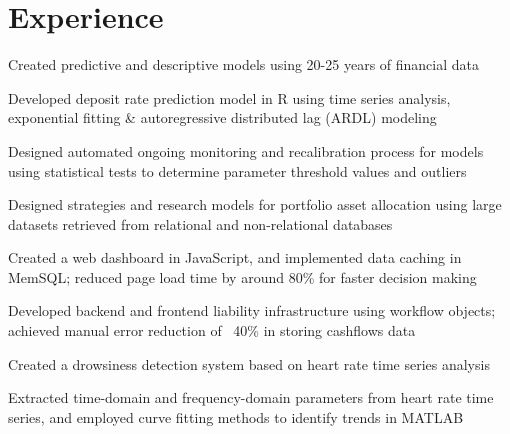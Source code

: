 \documentclass[]{deedy-resume-openfont}
\begin{document}
\begin{minipage}[t]{0.66\textwidth} 


\section{Experience}

\vspace{\topsep} %
\begin{tightemize}
\item Created predictive and descriptive models using 20-25 years of financial data
\item Developed deposit rate prediction model in R using time series analysis, exponential fitting \& autoregressive distributed lag (ARDL) modeling
\item Designed automated ongoing monitoring and recalibration process for models using statistical tests to determine parameter threshold values and outliers
\end{tightemize}
\sectionsep

\begin{tightemize}
\item Designed strategies and research models for portfolio asset allocation using large datasets retrieved from relational and non-relational databases 
\item Created a web dashboard in JavaScript, and implemented data caching in MemSQL; reduced page load time by around 80\% for faster decision making 
\item Developed backend and frontend liability infrastructure using workflow objects; achieved manual error reduction of ~40\% in storing cashflows data
\end{tightemize}
\sectionsep

\begin{tightemize}
\item Created a drowsiness detection system based on heart rate time series analysis 
\item Extracted time-domain and frequency-domain parameters from heart rate time series, and employed curve fitting methods to identify trends in MATLAB


\end{tightemize}
\end{minipage}
\end{document}
